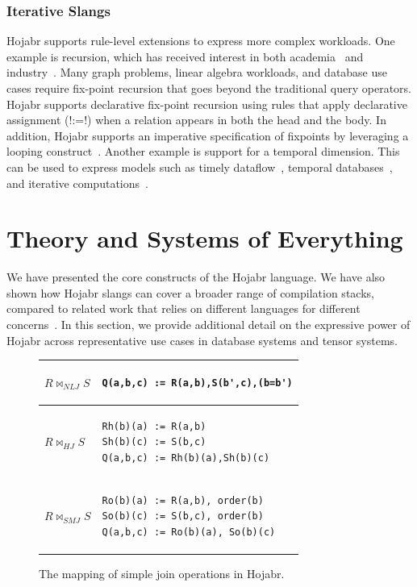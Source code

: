 \documentclass[sigconf,nonacm]{acmart}
\begin{document}
\subsubsection{Iterative Slangs} Hojabr supports rule-level extensions to express more complex workloads. One example is recursion, which has received interest in both academia~\cite{shaikhha2026raqlet,10.1145/3299869.3324959,dedalus2011} and industry~\cite{aref2025rel,aref2015design,96b066e5eacd43b299251ec2a7e06a8b}. Many graph problems, linear algebra workloads, and database use cases require fix-point recursion that goes beyond the traditional query operators. Hojabr supports declarative fix-point recursion using rules that apply declarative assignment (!:=!) when a relation appears in both the head and the body. In addition, Hojabr supports an imperative specification of fixpoints by leveraging a looping construct~\cite{DBLP:journals/pacmmod/ShaikhhaSSN24}. Another example is support for a temporal dimension. This can be used to express models such as timely dataflow~\cite{murray2013naiad}, temporal databases~\cite{snodgrass1986temporal}, and iterative computations~\cite{DBLP:journals/pacmmod/ShaikhhaSSN24,murray2016incremental}.

\section{Theory and Systems of Everything}
\label{sec:usecases}
We have presented the core constructs of the Hojabr language. We have also shown how Hojabr slangs can cover a broader range of compilation stacks, compared to related work that relies on different languages for different concerns~\cite{DBLP:conf/sigmod/ShaikhhaKPBD016,jungmair2022designing,shaikhha2018building}. In this section, we provide additional detail on the expressive power of Hojabr across representative use cases in database systems and tensor systems.


\begin{figure}[t!]
\begin{tabular}{|l|l|}
\hline
$R\bowtie_{NLJ} S$  &
\begin{lstlisting}
Q(a,b,c) := R(a,b),S(b',c),(b=b')
\end{lstlisting} \\ \hline
$R\bowtie_{HJ} S$  &
\begin{lstlisting}
Rh(b)(a) := R(a,b)
Sh(b)(c) := S(b,c)
Q(a,b,c) := Rh(b)(a),Sh(b)(c)
\end{lstlisting} \\ \hline
$R\bowtie_{SMJ} S$  &
\begin{lstlisting}
Ro(b)(a) := R(a,b), order(b)
So(b)(c) := S(b,c), order(b)
Q(a,b,c) := Ro(b)(a), So(b)(c)
\end{lstlisting} \\ \hline
\end{tabular}
\vspace{-0.3cm}
\caption{The mapping of simple join operations in Hojabr.}
\label{fig:simplejoin}
\vspace{-0.3cm}
\end{figure}
\end{document}
